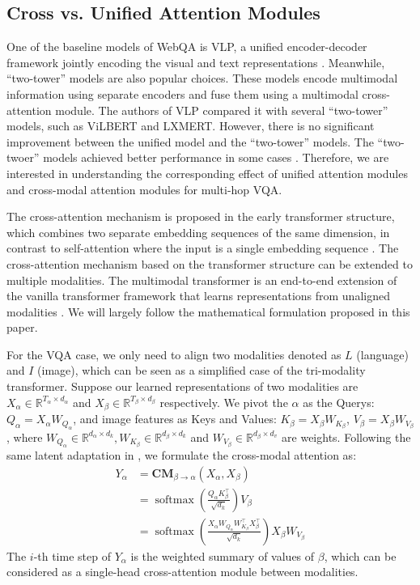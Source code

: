 \documentclass[nohyperref]{article}
\theoremstyle{plain}
\theoremstyle{definition}
\theoremstyle{remark}
\begin{document}
\subsection{Cross vs. Unified Attention Modules}\label{sec:cross_attention_research_idea}

One of the baseline models of WebQA is VLP, a unified encoder-decoder framework jointly encoding the visual and text representations \citep{vlp}. Meanwhile, ``two-tower'' models are also popular choices.
These models encode multimodal information using separate encoders and fuse them using a multimodal cross-attention module.
The authors of VLP \cite{vlp} compared it with several ``two-tower'' models, such as ViLBERT and LXMERT.
However, there is no significant improvement between the unified model and the ``two-tower'' models. The ``two-twoer'' models achieved better performance in some cases \cite{vlp}.
Therefore, we are interested in understanding the corresponding effect of unified attention modules and cross-modal attention modules for multi-hop VQA.

The cross-attention mechanism is proposed in the early transformer structure, which combines two separate embedding sequences of the same dimension, in contrast to self-attention where the input is a single embedding sequence \citep{transformer}.
The cross-attention mechanism based on the transformer structure can be extended to multiple modalities.
The multimodal transformer is an end-to-end extension of the vanilla transformer framework that learns representations from unaligned modalities \citep{mult}. We will largely follow the mathematical formulation proposed in this paper.

For the VQA case, we only need to align two modalities denoted as $L$ (language) and $I$ (image), which can be seen as a simplified case of the tri-modality transformer. Suppose our learned representations of two modalities are $X_\alpha \in \mathbb{R}^{T_\alpha \times d_\alpha}$ and $X_\beta \in \mathbb{R}^{T_\beta \times d_\beta}$ respectively. We pivot the $\alpha$ as the Querys: $Q_\alpha=X_\alpha W_{Q_\alpha}$, and image features as Keys and Values: $K_\beta=X_\beta W_{K_\beta}$, $V_\beta=X_\beta W_{V_\beta}$, where $W_{Q_\alpha} \in \mathbb{R}^{d_\alpha \times d_k}, W_{K_\beta} \in \mathbb{R}^{d_\beta \times d_k}$ and $W_{V_\beta} \in \mathbb{R}^{d_\beta \times d_v}$ are weights. Following the same latent adaptation in \citep{mult}, we formulate the cross-modal attention as:
$$\begin{aligned}
Y_\alpha &=\mathbf{C M}_{\beta \rightarrow \alpha}\left(X_\alpha, X_\beta\right) \\
&=\operatorname{softmax}\left(\frac{Q_\alpha K_\beta^{\top}}{\sqrt{d_k}}\right) V_\beta \\
&=\operatorname{softmax}\left(\frac{X_\alpha W_{Q_\alpha} W_{K_\beta}^{\top} X_\beta^{\top}}{\sqrt{d_k}}\right) X_\beta W_{V_\beta}
\end{aligned}$$
The $i$-th time step of $Y_\alpha$ is the weighted summary of values of $\beta$, which can be considered as a single-head cross-attention module between modalities.
\end{document}
